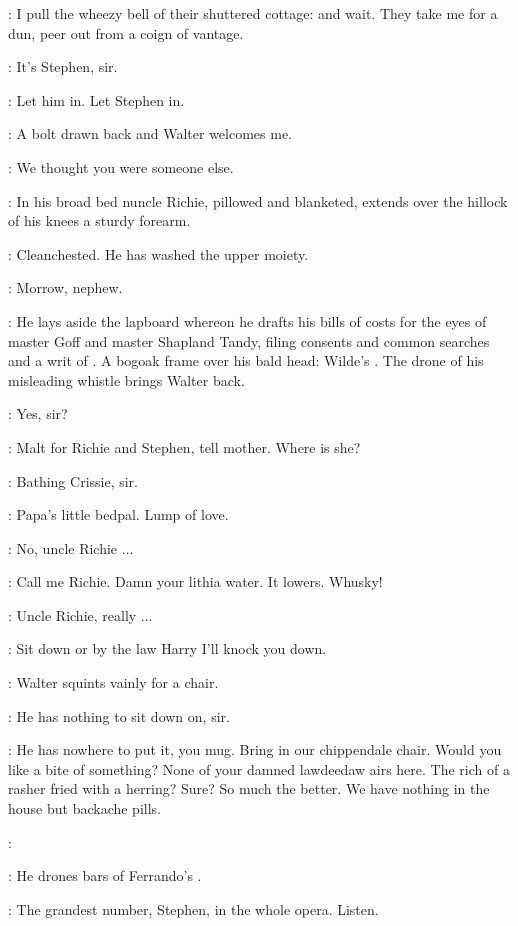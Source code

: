 \StephenInt:
I pull the wheezy bell of their shuttered cottage:
and wait.
They take me for a dun,
peer out from a coign of vantage.

\walter:
It's Stephen, sir.

\richie:
Let him in.
Let Stephen in.

\StephenInt:
A bolt drawn back and Walter welcomes me.

\walter:
We thought you were someone else.

:
In his broad bed
nuncle Richie, pillowed and blanketed,
extends over the hillock of his knees a sturdy forearm.

\StephenInt:
Cleanchested.
He has washed the upper moiety.

\richie:
Morrow, nephew.

:
He lays aside the lapboard whereon he drafts his bills of costs
for the eyes of master Goff and master Shapland Tandy,
filing consents and common searches and a writ of .
A bogoak frame over his bald head:
Wilde's .
The drone of his misleading whistle brings Walter back.

\walter:
Yes, sir?

\richie:
Malt for Richie and Stephen, tell mother.
Where is she?

\walter:
Bathing Crissie, sir.

\StephenInt:
Papa's little bedpal.
Lump of love.

\Stephen:
No, uncle Richie ...

\richie:
Call me Richie.
Damn your lithia water.
It lowers.
Whusky!

\Stephen:
Uncle Richie, really ...

\richie:
Sit down or by the law Harry
I'll knock you down.

:
Walter squints vainly for a chair.

\walter:
He has nothing to sit down on, sir.

\richie:
He has nowhere to put it, you mug.
Bring in our chippendale chair.
Would you like a bite of something?
None of your damned lawdeedaw airs here.
The rich of a rasher fried with a herring?
Sure?
So much the better.
We have nothing in the house but backache pills.

:

:
He drones bars of Ferrando's .

\richie:
The grandest number, Stephen,
in the whole opera.
Listen.

